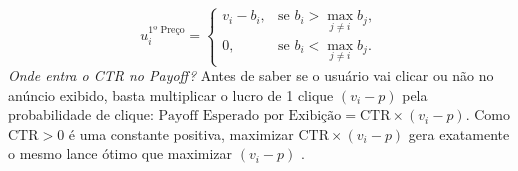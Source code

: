 \begin{enumerate}[label=\arabic*.]
\begin{equation}
    u_i^{\text{1º Preço}} =
    \begin{cases}
        v_i - b_i, & \text{se } b_i > \max\limits_{j \neq i} b_j, \\
        0, & \text{se } b_i < \max\limits_{j \neq i} b_j.
    \end{cases}
    \end{equation}
    \textit{Onde entra o CTR no Payoff?} Antes de saber se o usuário vai clicar ou não no anúncio exibido, basta multiplicar o lucro de 1 clique $(v_i - p)$ pela probabilidade de clique: $\text{Payoff Esperado por Exibição} = \text{CTR} \times (v_i - p)$. Como $\text{CTR} > 0$ é uma constante positiva, maximizar $\text{CTR} \times (v_i - p)$ gera exatamente o mesmo lance ótimo que maximizar $(v_i - p)$ \cite[p.~1164]{varian2007}.
\end{enumerate}
